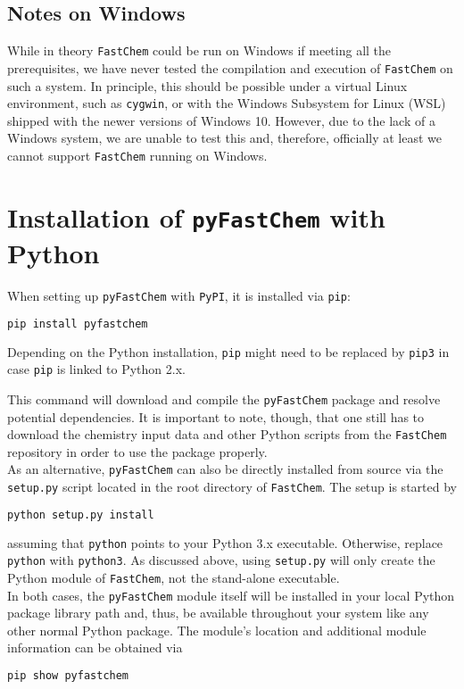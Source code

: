 \documentclass[numbers=noenddot]{aux/fcmanual}
\newcommand{\fc}{\texttt{FastChem}\xspace}
\newcommand{\pfc}{\texttt{pyFastChem}\xspace}
\begin{document}
\subsection{Notes on Windows}

While in theory \fc could be run on Windows if meeting all the prerequisites, we have never tested the compilation and execution of \fc on such a system. In principle, this should be possible under a virtual Linux environment, such as \texttt{cygwin}, or with the Windows Subsystem for Linux (WSL) shipped with the newer versions of Windows 10. However, due to the lack of a Windows system, we are unable to test this and, therefore, officially at least we cannot support \fc running on Windows.


\section{Installation of \pfc with Python}
\label{sec:install_python}

When setting up \pfc with \verb|PyPI|, it is installed via \verb|pip|:
\begin{lstlisting}[language=bash]
  pip install pyfastchem
\end{lstlisting}
Depending on the Python installation, \verb|pip| might need to be replaced by \verb|pip3| in case \verb|pip| is linked to Python 2.x.

This command will download and compile the \pfc package and resolve potential dependencies. It is important to note, though, that one still has to download the chemistry input data and other Python scripts from the \fc repository in order to use the package properly.\\

As an alternative, \pfc can also be directly installed from source via the \verb|setup.py| script located in the root directory of \fc. The setup is started by
\begin{lstlisting}[language=bash]
  python setup.py install
\end{lstlisting}
assuming that \verb|python| points to your Python 3.x executable. Otherwise, replace \verb|python| with \verb|python3|. As discussed above, using \verb|setup.py| will only create the Python module of \fc, not the stand-alone executable.\\

In both cases, the \pfc module itself will be installed in your local Python package library path and, thus, be available throughout your system like any other normal Python package. The module's location and additional module information can be obtained via
\begin{lstlisting}[language=bash]
  pip show pyfastchem
\end{lstlisting}
\end{document}
